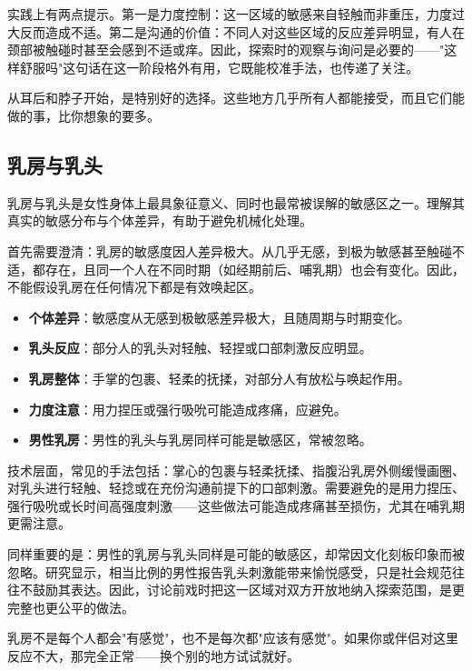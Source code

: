 \documentclass[12pt,UTF8]{ctexbook}
\newcommand{\keyword}[1]{\textbf{#1}}
\begin{document}
实践上有两点提示。第一是力度控制：这一区域的敏感来自轻触而非重压，力度过大反而造成不适。第二是沟通的价值：不同人对这些区域的反应差异明显，有人在颈部被触碰时甚至会感到不适或痒。因此，探索时的观察与询问是必要的——"这样舒服吗"这句话在这一阶段格外有用，它既能校准手法，也传递了关注。

\begin{tcolorbox}[colback=pink!5!white,colframe=red!50!black,title=贴心小叮咛]
从耳后和脖子开始，是特别好的选择。这些地方几乎所有人都能接受，而且它们能做的事，比你想象的要多。
\end{tcolorbox}
\subsection{乳房与乳头}

乳房与乳头是女性身体上最具象征意义、同时也最常被误解的敏感区之一。理解其真实的敏感分布与个体差异，有助于避免机械化处理。

首先需要澄清：乳房的敏感度因人差异极大。从几乎无感，到极为敏感甚至触碰不适，都存在，且同一个人在不同时期（如经期前后、哺乳期）也会有变化。因此，不能假设乳房在任何情况下都是有效唤起区。

\begin{itemize}
  \item \keyword{个体差异}：敏感度从无感到极敏感差异极大，且随周期与时期变化。
  \item \keyword{乳头反应}：部分人的乳头对轻触、轻捏或口部刺激反应明显。
  \item \keyword{乳房整体}：手掌的包裹、轻柔的抚揉，对部分人有放松与唤起作用。
  \item \keyword{力度注意}：用力捏压或强行吸吮可能造成疼痛，应避免。
  \item \keyword{男性乳房}：男性的乳头与乳房同样可能是敏感区，常被忽略。
\end{itemize}

技术层面，常见的手法包括：掌心的包裹与轻柔抚揉、指腹沿乳房外侧缓慢画圈、对乳头进行轻触、轻捻或在充份沟通前提下的口部刺激。需要避免的是用力捏压、强行吸吮或长时间高强度刺激——这些做法可能造成疼痛甚至损伤，尤其在哺乳期更需注意。

同样重要的是：男性的乳房与乳头同样是可能的敏感区，却常因文化刻板印象而被忽略。研究显示，相当比例的男性报告乳头刺激能带来愉悦感受，只是社会规范往往不鼓励其表达。因此，讨论前戏时把这一区域对双方开放地纳入探索范围，是更完整也更公平的做法。

\begin{tcolorbox}[colback=pink!5!white,colframe=red!50!black,title=贴心小叮咛]
乳房不是每个人都会"有感觉"，也不是每次都"应该有感觉"。如果你或伴侣对这里反应不大，那完全正常——换个别的地方试试就好。
\end{tcolorbox}
\end{document}

